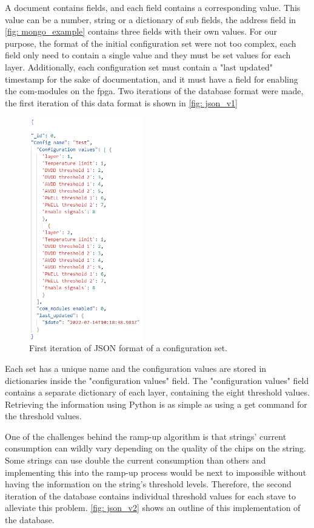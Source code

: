 \documentclass[main.tex]{subfiles}
\begin{document}
A document contains fields, and each field contains a corresponding value. This value can be a number, string or a dictionary of sub fields, the address field in \autoref{fig: mongo_example} contains three fields with their own values.
For our purpose, the format of the initial configuration set were not too complex, each field only need to contain a single value and they must be set values for each layer. Additionally, each configuration set must contain a "last updated" timestamp for the sake of documentation, and it must have a field for enabling the com-modules on the \gls{fpga}. Two iterations of the database format were made, the first iteration of this data format is shown in \autoref{fig: json_v1}

\begin{figure}[!ht]
    \centering
    \includegraphics[width=5cm, scale=1]{images/JSON_example_v1.png}
    \caption{First iteration of JSON format of a configuration set.}
    \label{fig: json_v1}
\end{figure}
\FloatBarrier

Each set has a unique name and the configuration values are stored in dictionaries inside the "configuration values" field. The "configuration values" field contains a separate dictionary of each layer, containing the eight threshold values. Retrieving the information using Python is as simple as using a get command for the threshold values.

One of the challenges behind the ramp-up algorithm is that strings' current consumption can wildly vary depending on the quality of the chips on the string. Some strings can use double the current consumption than others and implementing this into the ramp-up process would be next to impossible without having the information on the string's threshold levels. Therefore, the second iteration of the database contains individual threshold values for each stave to alleviate this problem. \autoref{fig: json_v2} shows an outline of this implementation of the database.
\end{document}
